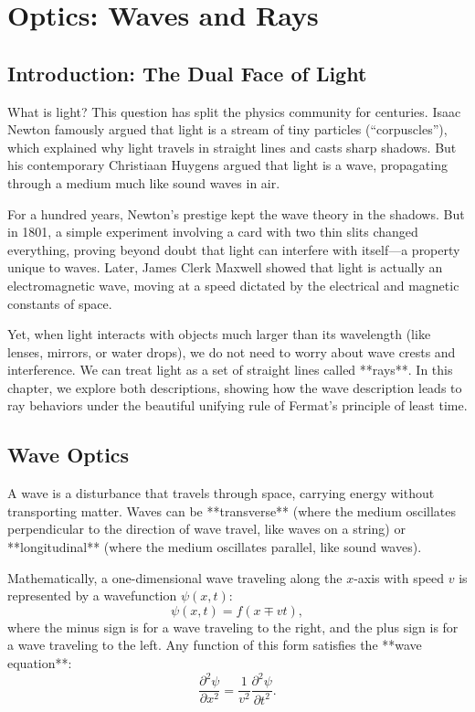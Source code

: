 \chapter{Optics: Waves and Rays}

\section{Introduction: The Dual Face of Light}

What is light? This question has split the physics community for centuries. Isaac Newton famously argued that light is a stream of tiny particles (``corpuscles''), which explained why light travels in straight lines and casts sharp shadows. But his contemporary Christiaan Huygens argued that light is a wave, propagating through a medium much like sound waves in air. 

For a hundred years, Newton's prestige kept the wave theory in the shadows. But in 1801, a simple experiment involving a card with two thin slits changed everything, proving beyond doubt that light can interfere with itself—a property unique to waves. Later, James Clerk Maxwell showed that light is actually an electromagnetic wave, moving at a speed dictated by the electrical and magnetic constants of space.

Yet, when light interacts with objects much larger than its wavelength (like lenses, mirrors, or water drops), we do not need to worry about wave crests and interference. We can treat light as a set of straight lines called **rays**. In this chapter, we explore both descriptions, showing how the wave description leads to ray behaviors under the beautiful unifying rule of Fermat's principle of least time.

\section{Wave Optics}

A wave is a disturbance that travels through space, carrying energy without transporting matter. Waves can be **transverse** (where the medium oscillates perpendicular to the direction of wave travel, like waves on a string) or **longitudinal** (where the medium oscillates parallel, like sound waves).

Mathematically, a one-dimensional wave traveling along the $x$-axis with speed $v$ is represented by a wavefunction $\psi(x,t)$:
\begin{equation}
    \psi(x,t) = f(x \mp v t),
\end{equation}
where the minus sign is for a wave traveling to the right, and the plus sign is for a wave traveling to the left. Any function of this form satisfies the **wave equation**:
\begin{equation}
    \frac{\partial^2\psi}{\partial x^2} = \frac{1}{v^2} \frac{\partial^2\psi}{\partial t^2}.
\end{equation}

